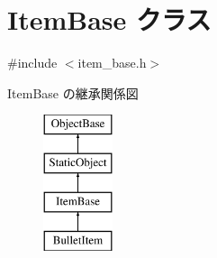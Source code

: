 \hypertarget{class_item_base}{}\section{Item\+Base クラス}
\label{class_item_base}


{\ttfamily \#include $<$item\+\_\+base.\+h$>$}

Item\+Base の継承関係図\begin{figure}[H]
\begin{center}
\leavevmode
\includegraphics[height=4.000000cm]{class_item_base}
\end{center}
\end{figure}
